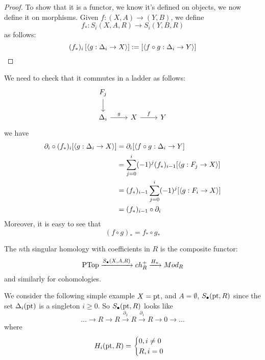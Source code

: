 \begin{proof}
    To show that it is a functor, we know it's defined on objects, we now define it on morphisms. Given $f:(X,A)\to (Y,B)$, we define 
    \begin{equation*}
        f_*:S_i(X,A,R)\to S_i(Y,B,R)
    \end{equation*}
    as follows:
    \begin{equation*}
        (f_*)_i\left[\langle g:\Delta_i\to X\rangle\right]:=\left[\langle f\circ g: \Delta_i\to Y\rangle \right]
    \end{equation*}
\end{proof}
We need to check that it commutes in a ladder as follows:
\[\begin{tikzcd}
	{F_j} \\
	{\Delta_i} & X & Y
	\arrow[from=1-1, to=2-1]
	\arrow["g", from=2-1, to=2-2]
	\arrow["f", from=2-2, to=2-3]
\end{tikzcd}\]
we have
\begin{align*}
    \partial_i\circ (f_*)_i[\langle g:\Delta_i\to X\rangle]&=\partial_i[\langle f\circ g:\Delta_i\to Y]\\
    &=\sum_{j=0}^i(-1)^j(f_*)_{i-1}[\langle g:F_j\to X\rangle]\\
    &=(f_*)_{i-1}\sum_{j=0}^{i}(-1)^j[\langle g:F_i\to X\rangle]\\
    &=(f_*)_{i-1}\circ\partial_i
\end{align*}
Moreover, it is easy to see that 
\begin{equation*}
    (f\circ g)_*=f_*\circ g_*
\end{equation*}
\begin{defn}
    The $n$th singular homology with coefficients in $R$ is the composite functor:
    \begin{equation*}
        \text{PTop}\xrightarrow{S_\bullet(X,A,R)}ch_R^+\xrightarrow{H_n}Mod_R
    \end{equation*}
    and similarly for cohomologies.
\end{defn}
\begin{example}
    We consider the following simple example $X=\text{pt}$, and $A=\emptyset$, $S_\bullet(\text{pt},R)$ since the set $\Delta_i(\text{pt})$ is a singleton $i\geq 0$. So $S_\bullet(\text{pt},R)$ looks like
    \begin{equation*}
        \dots\to R\to R\xrightarrow{\partial_2}R\xrightarrow{\partial_1}R\to 0\to\dots
    \end{equation*}
    where
    \begin{equation*}
        H_i(\text{pt},R)=\begin{cases}
            0, i\neq 0\\
            R, i=0
        \end{cases}
    \end{equation*}
\end{example}
